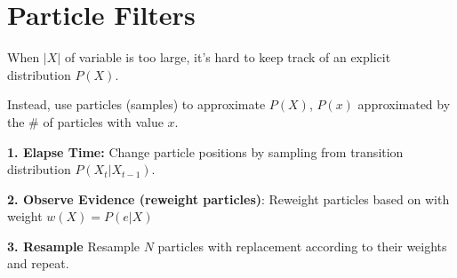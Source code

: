 \section{Particle Filters}
When $|X|$ of variable is too large, it's hard to keep track of an explicit distribution $P(X)$.

Instead, use particles (samples) to approximate $P(X)$, $P(x)$ approximated by the \# of particles with value $x$.

\textbf{1. Elapse Time:} Change particle positions by sampling from transition distribution $P(X_t|X_{t-1})$.

\textbf{2. Observe Evidence (reweight particles)}: 
Reweight particles based on with weight $w(X) = P(e|X)$

\textbf{3. Resample} Resample $N$ particles with replacement according to their weights and repeat.